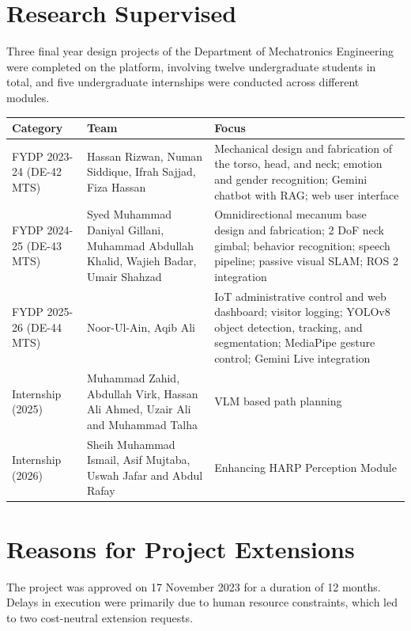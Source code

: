 \documentclass[11pt,a4paper]{article}
\begin{document}
\section{Research Supervised}
\label{sec:supervised}

Three final year design projects of the Department of Mechatronics Engineering were completed on the platform, involving twelve undergraduate students in total, and five undergraduate internships were conducted across different modules.

\begin{table}[H]
\centering
\begin{tabular}{@{}L{2.6cm}L{4.8cm}L{7cm}@{}}
\toprule
\textbf{Category} & \textbf{Team} & \textbf{Focus} \\
\midrule
FYDP 2023-24 (DE-42 MTS) & Hassan Rizwan, Numan Siddique, Ifrah Sajjad, Fiza Hassan & Mechanical design and fabrication of the torso, head, and neck; emotion and gender recognition; Gemini chatbot with RAG; web user interface \\
\addlinespace
FYDP 2024-25 (DE-43 MTS) & Syed Muhammad Daniyal Gillani, Muhammad Abdullah Khalid, Wajieh Badar, Umair Shahzad & Omnidirectional mecanum base design and fabrication; 2 DoF neck gimbal; behavior recognition; speech pipeline; passive visual SLAM; ROS 2 integration \\
\addlinespace
FYDP 2025-26 (DE-44 MTS) & Noor-Ul-Ain, Aqib Ali & IoT administrative control and web dashboard; visitor logging; YOLOv8 object detection, tracking, and segmentation; MediaPipe gesture control; Gemini Live integration \\
\addlinespace
Internship (2025) & Muhammad Zahid, Abdullah Virk, Hassan Ali Ahmed, Uzair Ali and Muhammad Talha & VLM based path planning \\
\addlinespace
Internship (2026) & Sheih Muhammad Ismail, Asif Mujtaba, Uswah Jafar and Abdul Rafay & Enhancing HARP Perception Module \\
\bottomrule
\end{tabular}
\end{table}





\section{Reasons for Project Extensions}

The project was approved on 17 November 2023 for a duration of 12 months. Delays in execution were primarily due to human resource constraints, which led to two cost-neutral extension requests.
\end{document}
